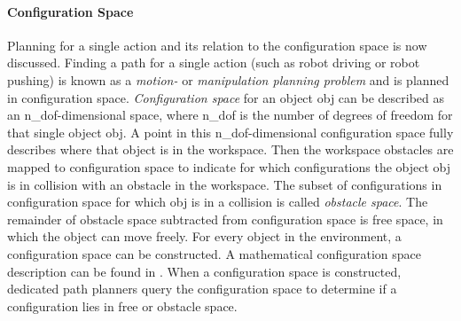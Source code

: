\paragraph{Configuration Space}
Planning for a single action and its relation to the configuration space is now discussed. Finding a path for a single action (such as robot driving or robot pushing) is known as a \textit{motion-} or \textit{manipulation planning problem} and is planned in configuration space. \textit{Configuration space} for an object \gls{obj} can be described as an \gls{n_dof}-dimensional space, where \gls{n_dof} is the number of degrees of freedom for that single object \gls{obj}. A point in this \gls{n_dof}-dimensional configuration space fully describes where that object is in the workspace. Then the workspace obstacles are mapped to configuration space to indicate for which configurations the object \gls{obj} is in collision with an obstacle in the workspace. The subset of configurations in configuration space for which \gls{obj} is in a collision is called \textit{obstacle space}. The remainder of obstacle space subtracted from configuration space is free space, in which the object can move freely. For every object in the environment, a configuration space can be constructed. A mathematical configuration space description can be found in . When a configuration space is constructed, dedicated path planners query the configuration space to determine if a configuration lies in free or obstacle space.\bs

